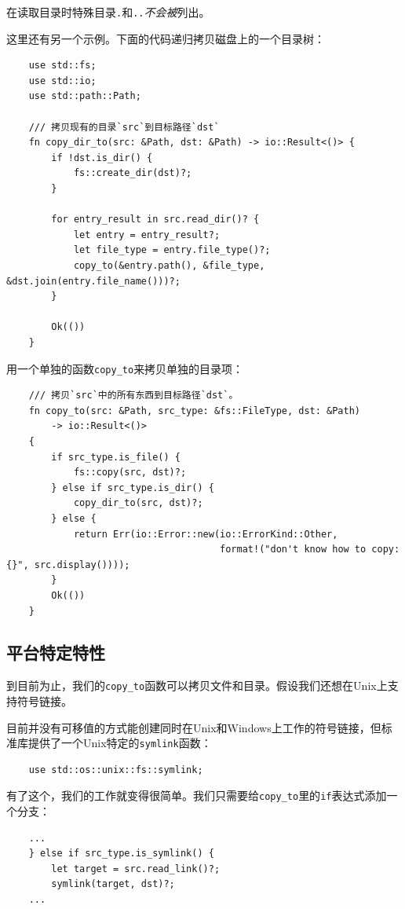 
在读取目录时特殊目录\texttt{.}和\texttt{..}\emph{不会被}列出。

这里还有另一个示例。下面的代码递归拷贝磁盘上的一个目录树：
\begin{verbatim}
    use std::fs;
    use std::io;
    use std::path::Path;

    /// 拷贝现有的目录`src`到目标路径`dst`
    fn copy_dir_to(src: &Path, dst: &Path) -> io::Result<()> {
        if !dst.is_dir() { 
            fs::create_dir(dst)?;
        }

        for entry_result in src.read_dir()? {
            let entry = entry_result?;
            let file_type = entry.file_type()?;
            copy_to(&entry.path(), &file_type, &dst.join(entry.file_name()))?;
        }

        Ok(())
    }
\end{verbatim}

用一个单独的函数\texttt{copy\_to}来拷贝单独的目录项：
\begin{verbatim}
    /// 拷贝`src`中的所有东西到目标路径`dst`。
    fn copy_to(src: &Path, src_type: &fs::FileType, dst: &Path)
        -> io::Result<()>
    {
        if src_type.is_file() {
            fs::copy(src, dst)?;
        } else if src_type.is_dir() {
            copy_dir_to(src, dst)?;
        } else {
            return Err(io::Error::new(io::ErrorKind::Other,
                                      format!("don't know how to copy: {}", src.display())));
        }                                                            
        Ok(())
    }
\end{verbatim}

\subsection{平台特定特性}\label{PlatSpec}
到目前为止，我们的\texttt{copy\_to}函数可以拷贝文件和目录。假设我们还想在Unix上支持符号链接。

目前并没有可移值的方式能创建同时在Unix和Windows上工作的符号链接，但标准库提供了一个Unix特定的\texttt{symlink}函数：
\begin{verbatim}
    use std::os::unix::fs::symlink;
\end{verbatim}

有了这个，我们的工作就变得很简单。我们只需要给\texttt{copy\_to}里的\texttt{if}表达式添加一个分支：
\begin{verbatim}
    ...
    } else if src_type.is_symlink() {
        let target = src.read_link()?;
        symlink(target, dst)?;
    ...
\end{verbatim}

